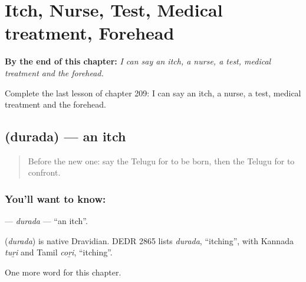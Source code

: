 
\chapter{Itch, Nurse, Test, Medical treatment, Forehead}
\label{ch:te-itch-nurse-test-medical-treatment-forehead}

\begin{chapteropening}
\textbf{By the end of this chapter:} \emph{I can say an itch, a nurse, a test, medical treatment and the forehead.}

Complete the last lesson of chapter 209: I can say an itch, a nurse, a test, medical treatment and the forehead.
\end{chapteropening}

\section[\texorpdfstring{\te{దురద} (durada)}{దురద (durada)}]{ (durada) — an itch}

\label{lesson:TE-C209-durada}



\begin{quote}
Before the new one: say the Telugu for to be born, then the Telugu for to confront.
\end{quote}

\subsection*{You'll want to know: }
\textbf{} — \emph{durada} — \textquotedblleft{}an itch\textquotedblright{}.

\begin{cousinweb}
\textbf{} (\emph{durada}) is native Dravidian. DEDR 2865 lists \emph{durada}, \textquotedblleft{}itching\textquotedblright{}, with Kannada \emph{tuṟi} and Tamil \emph{coṟi}, \textquotedblleft{}itching\textquotedblright{}.
\end{cousinweb}

\begin{grammarlens}[title={What you've built}]
One more word for this chapter.
\end{grammarlens}

